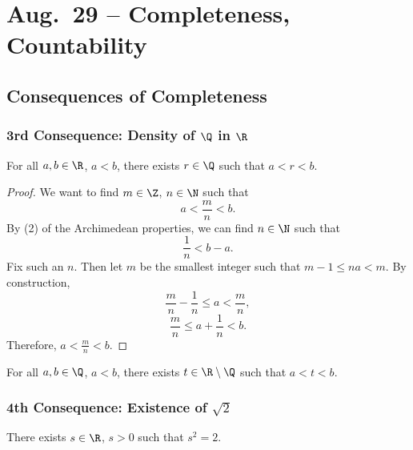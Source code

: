 \chapter{Aug.~29 -- Completeness, Countability}

\section{Consequences of Completeness}

\subsection{3rd Consequence: Density of \texorpdfstring{$\Q$}{Q} in \texorpdfstring{$\R$}{R}}
\begin{theorem}[Density of $\Q$ in $\R$]
For all $a, b \in \R$, $a < b$, there exists
$r \in \Q$ such that $a < r < b$.
\end{theorem}

\begin{proof}
  We want to find $m \in \Z$, $n \in \N$ such that
  \[
  a < \frac{m}{n} < b
  .\]
  By (2) of the Archimedean properties, we can find
  $n \in \N$ such that
  \[
  \frac{1}{n} < b - a
  .\]
  Fix such an $n$. Then let $m$ be the smallest integer
  such that $m - 1 \le na < m$. By construction,
  \[
  \frac{m}{n} - \frac{1}{n} \le a < \frac{m}{n},
  \]
  \[\frac{m}{n} \le a + \frac{1}{n} < b.\]
  Therefore, $a < \frac{m}{n} < b$.
\end{proof}

\begin{corollary}
  For all $a, b \in \Q$, $a < b$, there exists
   $t \in \R \setminus \Q$ such that  $a < t < b$.
\end{corollary}

\subsection{4th Consequence: Existence of \texorpdfstring{$\sqrt{2}$}{sqrt(2)}}
\begin{theorem}
  There exists $s \in \R$, $s > 0$ such that $s^2 = 2$.
\end{theorem}

